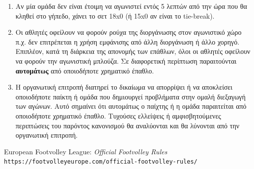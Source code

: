 \documentclass[a4paper,11pt]{article}
\begin{document}
\begin{enumerate}
\item Αν μία ομάδα δεν είναι έτοιμη να αγωνιστεί εντός 5 λεπτών από την ώρα που
  θα κληθεί στο γήπεδο, χάνει το σετ 18x0 (ή 15x0 αν είναι το tie-break).


\item Οι αθλητές οφείλουν να φορούν ρούχα της διοργάνωσης στον αγωνιστικό χώρο
  π.χ. δεν επιτρέπεται η χρήση εμφάνισης από άλλη διοργάνωση ή άλλο χορηγό.
  Επιπλέον, κατά τη διάρκεια της απονομής των επάθλων, όλοι οι αθλητές οφείλουν
  να φορούν την αγωνιστική μπλούζα. Σε διαφορετική περίπτωση παραιτούνται
  \textbf{αυτομάτως} από οποιοδήποτε χρηματικό έπαθλο.

\item Η οργανωτική επιτροπή διατηρεί το δικαίωμα να απορρίψει ή να αποκλείσει
  οποιοδήποτε παίκτη ή ομάδα που δημιουργεί προβλήματα στην ομαλή διεξαγωγή των
  αγώνων. Αυτό σημαίνει ότι αυτομάτως ο παίχτης ή η ομάδα παραιτείται από
  οποιοδήποτε χρηματικό έπαθλο. Τυχούσες ελλείψεις ή αμφισβητούμενες περιπτώσεις
  του παρόντος κανονισμού θα αναλύονται και θα λύνονται από την οργανωτική
  επιτροπή.

\end{enumerate}

\renewcommand{\refname}{}

\begin{thebibliography}{1}

  European Footvolley League:
  \textit{Official Footvolley Rules}
  \\\texttt{https://footvolleyeurope.com/official-footvolley-rules/}

\end{thebibliography}
\end{document}

